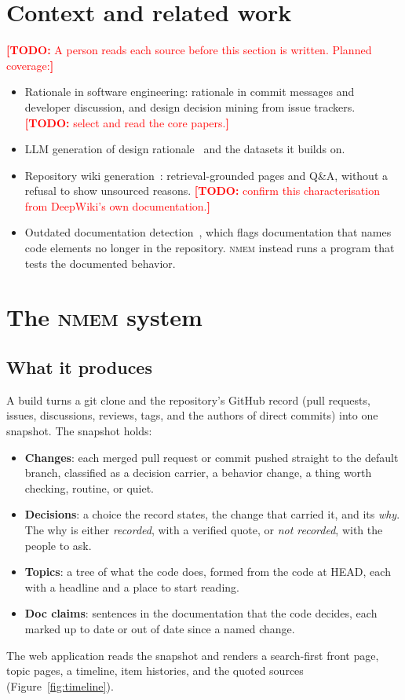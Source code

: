 \documentclass[acmsmall,screen,review]{acmart}
\newcommand{\todo}[1]{\textcolor{red}{\textbf{[TODO:} #1\textbf{]}}}
\newcommand{\nmem}{\textsc{nmem}}
\begin{document}
\section{Context and related work}

\todo{A person reads each source before this section is written. Planned coverage:}
\begin{itemize}
  \item Rationale in software engineering: rationale in commit messages and developer discussion, and design
        decision mining from issue trackers. \todo{select and read the core papers.}
  \item LLM generation of design rationale~\cite{llmdr2025} and the datasets it builds on.
  \item Repository wiki generation~\cite{deepwiki2025}: retrieval-grounded pages and Q\&A, without a refusal to
        show unsourced reasons. \todo{confirm this characterisation from DeepWiki's own documentation.}
  \item Outdated documentation detection~\cite{docer2023emse,docer2023icsme}, which flags documentation that names
        code elements no longer in the repository. \nmem{} instead runs a program that tests the documented behavior.
\end{itemize}

\section{The \nmem{} system}
\label{sec:system}

\subsection{What it produces}
A build turns a git clone and the repository's GitHub record (pull requests, issues, discussions, reviews, tags, and
the authors of direct commits) into one snapshot. The snapshot holds:
\begin{itemize}
  \item \textbf{Changes}: each merged pull request or commit pushed straight to the default branch, classified as a
        decision carrier, a behavior change, a thing worth checking, routine, or quiet.
  \item \textbf{Decisions}: a choice the record states, the change that carried it, and its \emph{why}. The why is
        either \emph{recorded}, with a verified quote, or \emph{not recorded}, with the people to ask.
  \item \textbf{Topics}: a tree of what the code does, formed from the code at HEAD, each with a headline and a
        place to start reading.
  \item \textbf{Doc claims}: sentences in the documentation that the code decides, each marked up to date or out of
        date since a named change.
\end{itemize}
The web application reads the snapshot and renders a search-first front page, topic pages, a timeline, item
histories, and the quoted sources (Figure~\ref{fig:timeline}).
\end{document}
